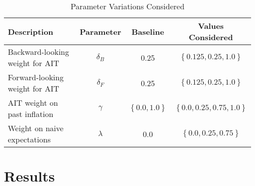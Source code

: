 \documentclass[12pt]{article}
\begin{document}
\begin{table}\caption{Parameter Variations Considered}\label{tb:parmsvary}
  \begin{center}
    \begin{tabular}{lccc}
      Description & Parameter & Baseline & Values Considered \\ \hline
      Backward-looking weight for AIT & $\delta_B$ & 0.25 & $\left\{0.125, 0.25, 1.0 \right\}$ \\  [0.25pc]
      Forward-looking weight for AIT & $\delta_F$ & 0.25 & $\left\{0.125, 0.25, 1.0 \right\}$ \\  [0.25pc]
      AIT weight on past inflation & $\gamma$ & $\left\{ 0.0, 1.0 \right\}$ & $\left\{ 0.0, 0.25, 0.75, 1.0\right\}$ \\  [0.25pc]
      Weight on naive expectations & $\lambda$ & 0.0 & $\left\{ 0.0, 0.25, 0.75 \right\}$ \\ [0.25pc]
      \hline
    \end{tabular}
  \end{center}
\end{table}

\section{Results}




\end{document}
